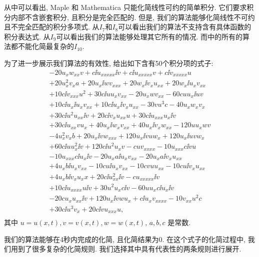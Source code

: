 从中可以看出, Maple 和 Mathematica 只能化简线性可约的简单积分. 它们要求积分内部不含嵌套积分, 且积分是完全匹配的. 但是, 我们的算法能够化简线性不可约且不完全匹配的积分多项式. 从$I_7$和$I_8$可以看出我们的算法不支持含有具体函数的积分表达式. 从$I_9$可以看出我们的算法能够处理其它所有的情况. 而中的所有的算法都不能化简最复杂的$I_{10}$. 

为了进一步展示我们算法的有效性, 给出如下含有50个积分项的式子:
\begin{equation}
\renewcommand{\arraystretch}{1.0}
\begin{array}{l}
-20u_xw_{xx}v
+c\ii{u_{xxxxx}\ii{v}}
+c\ii{u_{xxxxx}v}
+c\ii{v_{xxxxx}u}\\%
+20u_x^2v_xa
+20u_x\ii{wv_{xxx}}
+20w_x\ii{v_xu_{xx}}
+20w_x\ii{u_xv_{xx}}\\%
+10c\ii{v_{xxx}u^2}
+30c\ii{uu_xv_{xx}}
-20u_xwv_{xx}
-60cuu_x\ii{uv}\\%
+10c\ii{u_x\ii{u_xv_{xx}}}
+10c\ii{u_x\ii{v_xu_{xx}}}
-30vu^3c
-40u_xw_xv_x\\%
+30c\ii{u^2u_{xx}\ii{v}}
+20c\ii{v_xu_{xx}u}
+30c\ii{u_{xxx}u_x\ii{v}}\\%
+30c\ii{u_{xx}vu_x}
+40u_x\ii{w_xv_{xx}}
+40u_x\ii{v_xw_{xx}}
-120uu_xwv\\%
-4u_x^2v_xb
+20u_x\ii{vw_{xxx}}
+120u_x\ii{vuw_x}
+120u_x\ii{uvw_x}\\%
+60c\ii{uu_x^2\ii{v}}
+120c\ii{u^2u_xv}
-cuv_{xxxx}
-10u_{xxx}c\ii{vu}\\%
-10u_{xxx}c\ii{u_x\ii{v}}
-20u_xa\ii{u_xv_{xx}}
-20u_xa\ii{v_xu_{xx}}\\%
+4u_xb\ii{u_xv_{xx}}
-10cu\ii{u_xv_{xx}}
-10c v u u_{xx}
-10cu\ii{v_xu_{xx}}\\%
+4u_xb\ii{v_xu_xx}
+20c\ii{u_{xx}^2\ii{v}}
-cu_{xxxxx}\ii{v}\\%
+10c\ii{u_{xxxx}u\ii{v}}
+30u^2u_xc\ii{v}
-60uu_xc\ii{u_x\ii{v}}\\%
-20cu_xu_{xx}\ii{v}
+120u_x\ii{vwu_x}
+c\ii{u_xv_{xxxx}}
-10v_{xx}u^2c\\%
+30c\ii{u^3v_x}
+20c\ii{vu_{xxx}u},\\%
\end{array}
\label{big50}
\end{equation}
其中 $u=u(x,t),v=v(x,t),w=w(x,t)$, $a,b,c$ 是常数. 

我们的算法能够在4秒内完成的化简, 且化简结果为0. 在这个式子的化简过程中, 我们用到了很多复杂的化简规则. 我们选择其中具有代表性的两条规则进行展开. 


